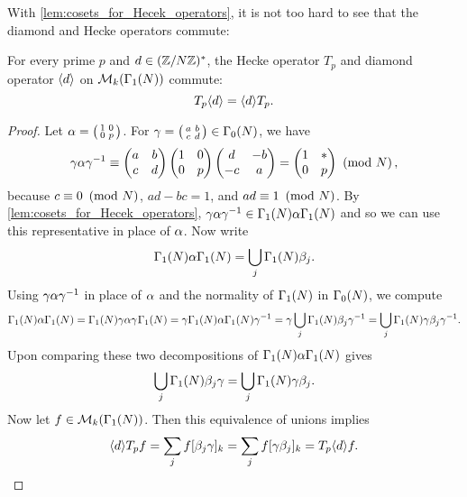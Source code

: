       With \cref{lem:cosets_for_Hecek_operators}, it is not too hard to see that the diamond and Hecke operators commute:

      \begin{proposition}\label{prop:diamond_Hecke_operators_commute_modular}
        For every prime $p$ and $d \in (\mathbb{Z}/N\mathbb{Z})^{\ast}$, the Hecke operator $T_{p}$ and diamond operator $\langle d\rangle$ on $\mathcal{M}_{k}(\Gamma_{1}(N))$ commute:
        \[
          T_{p}\langle d\rangle = \langle d\rangle T_{p}.
        \]
      \end{proposition}
      \begin{proof}
        Let $\alpha = \begin{psmallmatrix} 1 & 0 \\ 0 & p \end{psmallmatrix}$. For $\gamma = \begin{psmallmatrix} a & b \\ c & d \end{psmallmatrix} \in \Gamma_{0}(N)$, we have
        \[
          \gamma\alpha\gamma^{-1} \equiv \begin{pmatrix} a & b \\ c & d \end{pmatrix}\begin{pmatrix} 1 & 0 \\ 0 & p \end{pmatrix}\begin{pmatrix} d & -b \\ -c & a \end{pmatrix} = \begin{pmatrix} 1 & \ast \\ 0 & p \end{pmatrix} \ \left(\text{mod }N\right),
        \]
        because $c \equiv 0 \ \left(\text{mod }N\right)$, $ad-bc = 1$, and $ad \equiv {1} \ \left(\text{mod }N\right)$. By \cref{lem:cosets_for_Hecek_operators}, $\gamma\alpha\gamma^{-1} \in \Gamma_{1}(N)\alpha\Gamma_{1}(N)$ and so we can use this representative in place of $\alpha$. Now write
        \[
          \Gamma_{1}(N)\alpha\Gamma_{1}(N) = \bigcup_{j}\Gamma_{1}(N)\beta_{j}.
        \]
        Using $\gamma\alpha\gamma^{-1}$ in place of $\alpha$ and the normality of $\Gamma_{1}(N)$ in $\Gamma_{0}(N)$, we compute
        \[
          \Gamma_{1}(N)\alpha\Gamma_{1}(N) = \Gamma_{1}(N)\gamma\alpha\gamma^{}\Gamma_{1}(N) = \gamma\Gamma_{1}(N)\alpha\Gamma_{1}(N)\gamma^{-1} = \gamma\bigcup_{j}\Gamma_{1}(N)\beta_{j}\gamma^{-1} = \bigcup_{j}\Gamma_{1}(N)\gamma\beta_{j}\gamma^{-1}.
        \]
        Upon comparing these two decompositions of $\Gamma_{1}(N)\alpha\Gamma_{1}(N)$ gives
        \[
          \bigcup_{j}\Gamma_{1}(N)\beta_{j}\gamma = \bigcup_{j}\Gamma_{1}(N)\gamma\beta_{j}.
        \]
        Now let $f \in \mathcal{M}_{k}(\Gamma_{1}(N))$. Then this equivalence of unions implies
        \[
        \langle d\rangle T_{p}f = \sum_{j}f[\beta_{j}\gamma]_{k} = \sum_{j}f[\gamma\beta_{j}]_{k} = T_{p}\langle d\rangle f.
        \]
      \end{proof}
      
